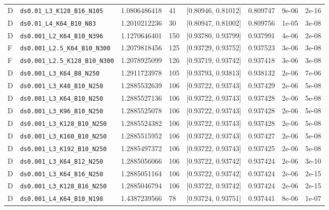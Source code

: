 \begin{longtable}{@{}llrllllr@{}}
D & \texttt{ds0.01\_L3\_K128\_B16\_N105} & 1.0806486418 & 41 & [0.80946, 0.81012] & 0.809747 & 9e-06 & 2e-16\\
D & \texttt{ds0.01\_L4\_K64\_B10\_N83} & 1.2010212236 & 30 & [0.80947, 0.81002] & 0.809756 & 1e-05 & 3e-08\\
D & \texttt{ds0.001\_L2\_K64\_B10\_N396} & 1.1270646401 & 150 & [0.93780, 0.93799] & 0.937991 & 4e-06 & 2e-08\\
F & \texttt{ds0.001\_L2.5\_K64\_B10\_N300} & 1.2079818456 & 125 & [0.93729, 0.93752] & 0.937523 & 3e-06 & 3e-08\\
F & \texttt{ds0.001\_L2.5\_K128\_B10\_N300} & 1.2078925099 & 126 & [0.93719, 0.93742] & 0.937418 & 3e-06 & 3e-08\\
D & \texttt{ds0.001\_L3\_K64\_B8\_N250} & 1.2911723978 & 105 & [0.93793, 0.93813] & 0.938132 & 2e-06 & 7e-06\\
D & \texttt{ds0.001\_L3\_K48\_B10\_N250} & 1.2885532639 & 106 & [0.93722, 0.93743] & 0.937429 & 2e-06 & 5e-08\\
D & \texttt{ds0.001\_L3\_K64\_B10\_N250} & 1.2885527136 & 106 & [0.93722, 0.93743] & 0.937428 & 2e-06 & 5e-08\\
D & \texttt{ds0.001\_L3\_K96\_B10\_N250} & 1.2885525078 & 106 & [0.93722, 0.93743] & 0.937428 & 2e-06 & 5e-08\\
D & \texttt{ds0.001\_L3\_K128\_B10\_N250} & 1.2885524382 & 106 & [0.93722, 0.93743] & 0.937428 & 2e-06 & 5e-08\\
D & \texttt{ds0.001\_L3\_K160\_B10\_N250} & 1.2885515952 & 106 & [0.93722, 0.93743] & 0.937427 & 2e-06 & 5e-08\\
D & \texttt{ds0.001\_L3\_K192\_B10\_N250} & 1.2885497372 & 106 & [0.93722, 0.93743] & 0.937425 & 2e-06 & 5e-08\\
D & \texttt{ds0.001\_L3\_K64\_B12\_N250} & 1.2885056066 & 106 & [0.93722, 0.93742] & 0.937424 & 2e-06 & 3e-10\\
D & \texttt{ds0.001\_L3\_K64\_B16\_N250} & 1.2885051164 & 106 & [0.93722, 0.93742] & 0.937424 & 2e-06 & 2e-15\\
D & \texttt{ds0.001\_L3\_K128\_B16\_N250} & 1.2885046794 & 106 & [0.93722, 0.93742] & 0.937424 & 2e-06 & 2e-15\\
D & \texttt{ds0.001\_L4\_K64\_B10\_N198} & 1.4387239566 & 78 & [0.93724, 0.93751] & 0.937441 & 8e-06 & 1e-07\\
\bottomrule
\end{longtable}
